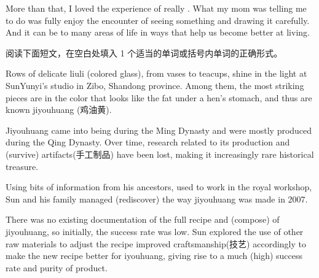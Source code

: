 \documentclass{英语试卷}
\begin{document}
\par More than that, I loved the experience of really . What my mom was telling me to do was fully enjoy the encounter of seeing something  and drawing it carefully. And it can be  to many areas of life in ways that help us become better at living.\par
{}
\par 阅读下面短文，在空白处填入 1 个适当的单词或括号内单词的正确形式。\par
\par Rows of delicate liuli (colored glass), from vases to teacups, shine in the light at SunYunyi's studio in Zibo, Shandong province. Among them, the most striking pieces are in the color that looks like the fat under a hen's stomach, and thus are known  jiyouhuang (鸡油黄).\par
\par Jiyouhuang came into being during the Ming Dynasty and were mostly produced during the Qing Dynasty. Over time, research related to its production and  (survive) artifacts(手工制品) have been lost, making it  increasingly rare historical treasure.\par
\par Using bits of information from his ancestors,  used to work in the royal workshop, Sun and his family managed  (rediscover) the way jiyouhuang was made in 2007.\par
\par There was no existing documentation of the full recipe and  (compose) of jiyouhuang, so initially, the success rate was low. Sun explored the use of other raw materials to adjust the recipe  improved craftsmanship(技艺) accordingly to make the new recipe better for iyouhuang, giving rise to a much  (high) success rate and purity of product.\par
\end{document}
